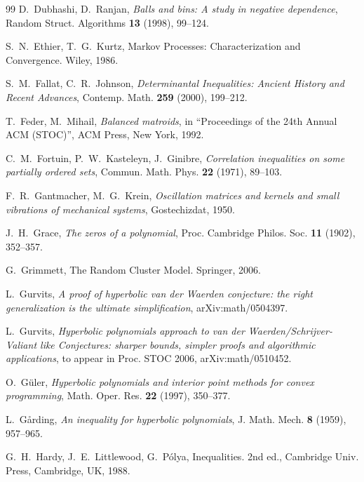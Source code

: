 \documentclass[10pt,reqno]{amsart}
\theoremstyle{plain}
\theoremstyle{definition}
\theoremstyle{remark}
\begin{document}
\begin{thebibliography}{99}
D.~Dubhashi, D.~Ranjan, 
{\em Balls and bins: A study in negative dependence}, Random Struct. 
Algorithms {\bf 13} (1998), 99--124.

S.~N.~Ethier, T.~G.~Kurtz, Markov Processes: Characterization and
Convergence. Wiley, 1986.

S.~M.~Fallat, C.~R.~Johnson, {\em Determinantal Inequalities: Ancient History
and Recent Advances}, Contemp. Math. {\bf 259} (2000), 199--212.

T.~Feder, M.~Mihail, {\em Balanced matroids}, in ``Proceedings of the 24th 
Annual ACM (STOC)'', ACM Press, New York, 1992.

C.~M.~Fortuin, P.~W.~Kasteleyn, J.~Ginibre, {\em Correlation inequalities on 
some partially ordered sets}, Commun. Math. Phys. {\bf 22} (1971), 89--103.

F.~R.~Gantmacher, M.~G.~Krein, {\em Oscillation matrices and kernels and small
vibrations of mechanical systems}, Gostechizdat, 1950.

J.~H.~Grace, {\em The zeros of a polynomial}, Proc. Cambridge Philos. Soc. 
{\bf 11} (1902), 352--357.

G.~Grimmett, The Random Cluster Model. Springer, 2006.  

L.~Gurvits, {\em  A proof of hyperbolic van der Waerden conjecture: 
the right generalization is the ultimate simplification}, arXiv:math/0504397.

L.~Gurvits, {\em Hyperbolic polynomials approach to van der 
Waerden/Schrijver-Valiant like Conjectures: sharper bounds, simpler proofs 
and algorithmic
applications}, to appear in Proc. STOC 2006,  arXiv:math/0510452.


O.~G\"uler, {\em Hyperbolic polynomials and interior point 
methods for convex programming}, Math. Oper. Res. {\bf 22} (1997), 350--377.

L.~G\aa rding, {\em An inequality for hyperbolic polynomials}, 
J. Math. Mech. {\bf 8} (1959), 957--965. 

G.~H.~Hardy, J.~E.~Littlewood, G.~P\'olya, Inequalities. 2nd ed., Cambridge 
Univ. Press, Cambridge, UK, 1988.


\end{thebibliography}
\end{document}
